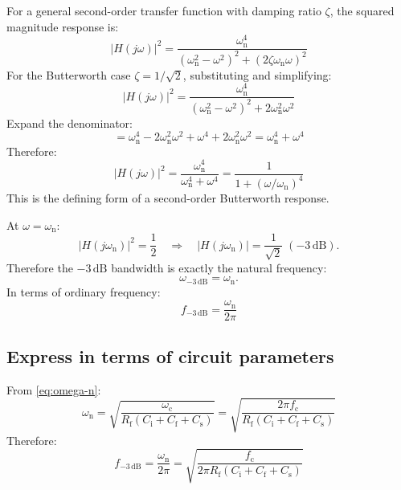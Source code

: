 \documentclass[a4paper,11pt]{article}
\begin{document}
For a general second-order transfer function with damping ratio
$\zeta$, the squared magnitude response is:
\begin{equation*}
  |H(j\omega)|^2
  = \frac{\omega_{\mathrm{n}}^4}
         {(\omega_{\mathrm{n}}^2 - \omega^2)^2
          + (2\zeta\omega_{\mathrm{n}}\omega)^2}
\end{equation*}
For the Butterworth case $\zeta = 1/\sqrt{2}$, substituting and
simplifying:
\begin{equation*}
  |H(j\omega)|^2
  = \frac{\omega_{\mathrm{n}}^4}
         {(\omega_{\mathrm{n}}^2 - \omega^2)^2
          + 2\omega_{\mathrm{n}}^2\omega^2}
\end{equation*}
Expand the denominator:
\begin{equation*}
  = \omega_{\mathrm{n}}^4
    - 2\omega_{\mathrm{n}}^2\omega^2 + \omega^4
    + 2\omega_{\mathrm{n}}^2\omega^2
  = \omega_{\mathrm{n}}^4 + \omega^4
\end{equation*}
Therefore:
\begin{equation}
  |H(j\omega)|^2
  = \frac{\omega_{\mathrm{n}}^4}
         {\omega_{\mathrm{n}}^4 + \omega^4}
  = \frac{1}{1 + (\omega/\omega_{\mathrm{n}})^4}
  \label{eq:bw-mag}
\end{equation}
This is the defining form of a second-order Butterworth response.

At $\omega = \omega_{\mathrm{n}}$:
\begin{equation*}
  |H(j\omega_{\mathrm{n}})|^2 = \frac{1}{2}
  \quad\Longrightarrow\quad
  |H(j\omega_{\mathrm{n}})| = \frac{1}{\sqrt{2}}
  \;(-3\,\mathrm{dB}).
\end{equation*}
Therefore the $-3\,\mathrm{dB}$ bandwidth is exactly the natural
frequency:
\begin{equation*}
  \omega_{-3\,\mathrm{dB}} = \omega_{\mathrm{n}}.
\end{equation*}
In terms of ordinary frequency:
\begin{equation}
  f_{-3\,\mathrm{dB}} = \frac{\omega_{\mathrm{n}}}{2\pi}
  \label{eq:f3dB}
\end{equation}

\subsection{Express in terms of circuit parameters}

From \eqref{eq:omega-n}:
\begin{equation*}
  \omega_{\mathrm{n}}
  = \sqrt{\frac{\omega_{\mathrm{c}}}
               {R_{\mathrm{f}}(C_{\mathrm{i}} + C_{\mathrm{f}}
                + C_{\mathrm{s}})}}
  = \sqrt{\frac{2\pi f_{\mathrm{c}}}
               {R_{\mathrm{f}}(C_{\mathrm{i}} + C_{\mathrm{f}}
                + C_{\mathrm{s}})}}
\end{equation*}
Therefore:
\begin{equation}
  f_{-3\,\mathrm{dB}}
  = \frac{\omega_{\mathrm{n}}}{2\pi}
  = \sqrt{\frac{f_{\mathrm{c}}}
               {2\pi R_{\mathrm{f}}(C_{\mathrm{i}} + C_{\mathrm{f}}
                + C_{\mathrm{s}})}}
  \label{eq:f3dB-circuit}
\end{equation}
\end{document}
